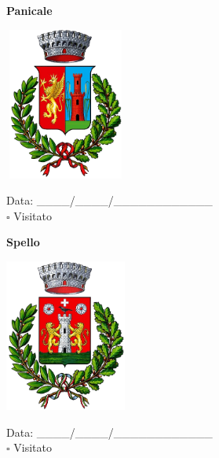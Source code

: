 \documentclass[a5paper,12pt]{article}
\begin{document}
\vspace{0.7cm}

\noindent
\begin{minipage}[t]{0.45\textwidth}
    \begin{center}
        \textbf{Panicale}
    \end{center}
    \vspace{-0.5cm} %
    \begin{center}
        \includegraphics[height= 5cm, width=4cm]{Umbria/Stemma Panicale.png}
    \end{center}
    \vspace{-0.4cm} %
    \begin{flushleft}
        Data: \_\_\_\_/\_\_\_\_/\_\_\_\_\_\_\_\_\_\_\_\_ \\
        $\square$ Visitato
    \end{flushleft}
\end{minipage}
\hfill
\noindent
\begin{minipage}[t]{0.45\textwidth}
    \begin{center}
        \textbf{Spello}
    \end{center}
    \vspace{-0.5cm} %
    \begin{center}
        \includegraphics[height= 5cm, width=4cm]{Umbria/Stemma Spello.png}
    \end{center}
    \vspace{-0.4cm} %
    \begin{flushleft}
        Data: \_\_\_\_/\_\_\_\_/\_\_\_\_\_\_\_\_\_\_\_\_ \\
        $\square$ Visitato
    \end{flushleft}
\end{minipage}
\end{document}

